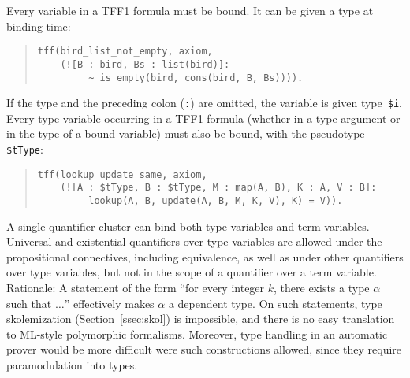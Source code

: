 Every variable in a TFF1 formula must be bound. It can be given a type at
binding time:
\begin{quote}
\begin{verbatim}
tff(bird_list_not_empty, axiom,
    (![B : bird, Bs : list(bird)]:
         ~ is_empty(bird, cons(bird, B, Bs)))).
\end{verbatim}
\end{quote}
If the type and the preceding colon ({\tt :}) are omitted, the variable is given
type~{\tt\$i}. Every type variable occurring in a TFF1 formula
(whether in a type argument or in the type of a bound variable)
must also be bound, with the pseudotype {\tt\$tType}:
\begin{quote}
\begin{verbatim}
tff(lookup_update_same, axiom,
    (![A : $tType, B : $tType, M : map(A, B), K : A, V : B]:
         lookup(A, B, update(A, B, M, K, V), K) = V)).
\end{verbatim}
\end{quote}
A single quantifier cluster can bind both type variables and term variables.
%
Universal and existential quantifiers over type variables are allowed under the
propositional connectives, including equivalence, as well as under other
quantifiers over type variables, but not in the scope of a quantifier over a
term variable.
Rationale: A statement of the form ``for every integer $k$, there exists a type
$\alpha$ such that $\ldots$'' effectively makes $\alpha$ a dependent type.
On such statements, type skolemization (Section~\ref{ssec:skol}) is impossible,
and there is no easy translation to ML-style polymorphic formalisms.
Moreover, type handling in an automatic prover would be more difficult were
such constructions allowed, since they require paramodulation into types.

